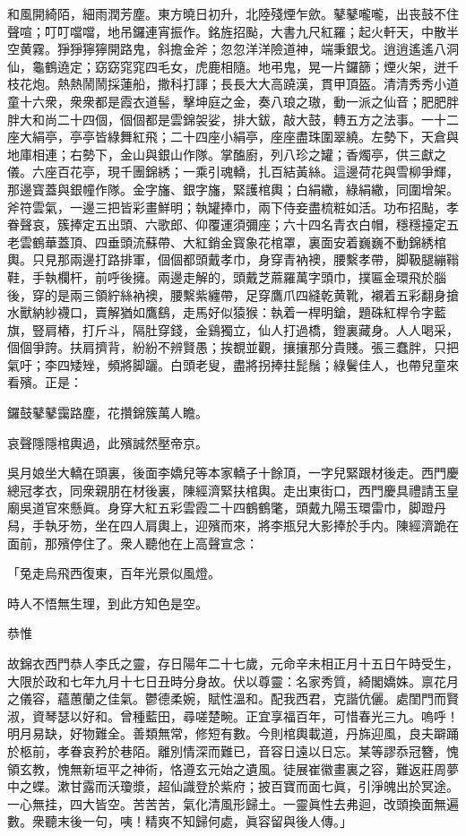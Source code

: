 \begin{myquote}
和風開綺陌，細雨潤芳塵。東方曉日初升，北陸殘煙乍歛。鼕鼕嚨嚨，出丧鼓不住聲喧；叮叮噹噹，地吊鑼連宵振作。銘旌招颭，大書九尺紅羅；起火軒天，中散半空黄霧。猙猙獰獰開路鬼，斜擔金斧；忽忽洋洋險道神，端秉銀戈。逍逍遙遙八洞仙，龜鶴遶定；窈窈窕窕四毛女，虎鹿相隨。地弔鬼，晃一片鑼篩；煙火架，迸千枝花炮。熱熱鬧鬧採蓮船，撒科打諢；長長大大高蹺漢，貫甲頂盔。清清秀秀小道童十六衆，衆衆都是霞衣道髻，擊坤庭之金，奏八琅之璈，動一派之仙音；肥肥胖胖大和尚二十四個，個個都是雲錦袈娑，排大鈸，敲大鼓，轉五方之法事。一十二座大絹亭，亭亭皆綠舞紅飛；二十四座小絹亭，座座盡珠圍翠繞。左勢下，天倉與地庫相連；右勢下，金山與銀山作隊。掌醢廚，列八珍之罐；香燭亭，供三獻之儀。六座百花亭，現千團錦綉；一乘引魂轎，扎百結黃絲。這邊荷花與雪柳爭輝，那邊寳蓋與銀幢作隊。金字旛、銀字旛，緊護棺輿；白絹繖，綠絹繖，同圍增架。斧符雲氣，一邊三把皆彩畫鮮明；執罐捧巾，兩下侍妾盡梳粧如活。功布招颭，孝眷聲哀，簇捧定五出頭、六歌郎、仰覆運須彌座；六十四名青衣白帽，穩穩擡定五老雲鶴華蓋頂、四垂頭流蘇帶、大紅銷金寳象花棺罩，裏面安着巍巍不動錦綉棺輿。只見那兩邊打路排軍，個個都頭戴孝巾，身穿青衲襖，腰繫孝帶，脚靸腿繃䩺鞋，手執欄杆，前呼後擁。兩邊走解的，頭戴芝蔴羅萬字頭巾，撲匾金環飛於腦後，穿的是兩三領紵絲衲襖，腰繫紫纏帶，足穿鷹爪四縫乾黄靴，襯着五彩翻身搶水獸納紗襪口，賣解猶如鷹鷂，走馬好似猿猴：執着一桿明鎗，題硃紅桿令字藍旗，豎肩樁，打斤斗，隔肚穿錢，金鷄獨立，仙人打過橋，鐙裏藏身。人人喝采，個個爭誇。扶肩擠背，紛紛不辨賢愚；挨覩並觀，攘攘那分貴賤。張三蠢胖，只把氣吁；李四矮矬，頻將脚躧。白頭老叟，盡將拐捧拄髭鬚；綠鬢佳人，也帶兒童來看殯。正是：

鑼鼓鼕鼕靄路塵，花攢錦簇萬人瞻。

哀聲隱隱棺輿過，此殯誠然壓帝京。
\end{myquote}

吳月娘坐大轎在頭裏，後面李嬌兒等本家轎子十餘頂，一字兒緊跟材後走。西門慶總冠孝衣，同衆親朋在材後裏，陳經濟緊扶棺輿。走出東街口，西門慶具禮請玉皇廟吳道官來懸眞。身穿大紅五彩雲霞二十四鶴鶴氅，頭戴九陽玉環雷巾，脚蹬丹舄，手執牙笏，坐在四人肩輿上，迎殯而來，將李瓶兒大影捧於手内。陳經濟跪在面前，那殯停住了。衆人聽他在上高聲宣念：

\begin{myquote}
「兔走烏飛西復東，百年光景似風燈。

時人不悟無生理，到此方知色是空。

恭惟

故錦衣西門恭人李氏之靈，存日陽年二十七歲，元命辛未相正月十五日午時受生，大限於政和七年九月十七日丑時分身故。伏以尊靈：名家秀質，綺閣嬌姝。禀花月之儀容，蘊蕙蘭之佳氣。鬱德柔婉，賦性溫和。配我西君，克諧伉儷。處閨門而賢淑，資琴瑟以好和。曾種藍田，尋嗟楚畹。正宜享福百年，可惜春光三九。嗚呼！明月易缺，好物難全。善類無常，修短有數。今則棺輿載道，丹旆迎風，良夫躃踊於柩前，孝眷哀矜於巷陌。離別情深而難已，音容日遠以日忘。某等謬忝冠簪，愧領玄教，愧無新垣平之神術，恪遵玄元始之遺風。徒展崔徽畫裏之容，難返莊周夢中之蝶。漱甘露而沃瓊漿，超仙識登於紫府；披百寶而面七眞，引淨魄出於冥途。一心無挂，四大皆空。苦苦苦，氣化清風形歸土。一靈眞性去弗迴，改頭換面無遍數。衆聽末後一句，咦！精爽不知歸何處，眞容留與後人傳。」
\end{myquote}

